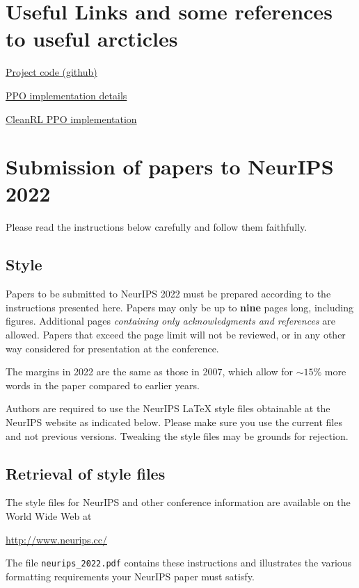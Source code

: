 \documentclass{article}
\begin{document}
\section{Useful Links and some references to useful arcticles}
\href{https://github.com/ancaah/autonomous}{Project code (github)}

\href{https://iclr-blog-track.github.io/2022/03/25/ppo-implementation-details/}{PPO implementation details}

\href{https://github.com/vwxyzjn/cleanrl/blob/master/cleanrl/ppo.py}{CleanRL PPO implementation}

\section{Submission of papers to NeurIPS 2022}


Please read the instructions below carefully and follow them faithfully.


\subsection{Style}


Papers to be submitted to NeurIPS 2022 must be prepared according to the
instructions presented here. Papers may only be up to {\bf nine} pages long,
including figures. Additional pages \emph{containing only acknowledgments and
references} are allowed. Papers that exceed the page limit will not be
reviewed, or in any other way considered for presentation at the conference.


The margins in 2022 are the same as those in 2007, which allow for $\sim$$15\%$
more words in the paper compared to earlier years.


Authors are required to use the NeurIPS \LaTeX{} style files obtainable at the
NeurIPS website as indicated below. Please make sure you use the current files
and not previous versions. Tweaking the style files may be grounds for
rejection.


\subsection{Retrieval of style files}


The style files for NeurIPS and other conference information are available on
the World Wide Web at
\begin{center}
  \url{http://www.neurips.cc/}
\end{center}
The file \verb+neurips_2022.pdf+ contains these instructions and illustrates the
various formatting requirements your NeurIPS paper must satisfy.
\end{document}
